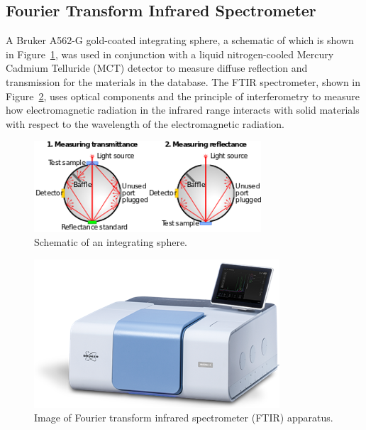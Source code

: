 \documentclass[12pt,oneside]{book}
\begin{document}
\subsection{Fourier Transform Infrared Spectrometer}
\label{sec:ftir}

A Bruker A562-G gold-coated integrating sphere, a schematic of which is shown in Figure~\ref{fig:IS_apparatus}, was used in conjunction with a liquid nitrogen-cooled Mercury Cadmium Telluride (MCT) detector to measure diffuse reflection and transmission for the materials in the database. The FTIR spectrometer, shown in Figure~\ref{fig:FTIR_apparatus}, uses optical components and the principle of interferometry to measure how electromagnetic radiation in the infrared range interacts with solid materials with respect to the wavelength of the electromagnetic radiation. 

\begin{figure}[!ht]
\centering
\includegraphics[width=.75\columnwidth]{Figures/IS.png}
\caption[Schematic of an Integrating Sphere]{Schematic of an integrating sphere.}
\label{fig:IS_apparatus}
\end{figure}

\begin{figure}[!ht]
\centering
\includegraphics[width=.75\columnwidth]{Figures/FTIR.png}
\caption[Image of Fourier Transform Infrared Spectrometer (FTIR) Apparatus]{Image of Fourier transform infrared spectrometer (FTIR) apparatus.}
\label{fig:FTIR_apparatus}
\end{figure}
\end{document}
